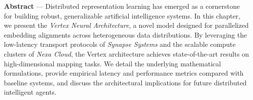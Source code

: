 \begin{tcolorbox}[
    colback=lightbg,
    colframe=secondary,
    arc=0mm,
    outer arc=0mm,
    leftrule=3mm,
    rightrule=0mm,
    toprule=0mm,
    bottomrule=0mm,
    boxsep=4pt,
    left=15pt,
    right=15pt,
    top=10pt,
    bottom=10pt
]
\small
\textbf{Abstract} --- Distributed representation learning has emerged as a cornerstone for building robust, generalizable artificial intelligence systems. In this chapter, we present the \emph{Vertex Neural Architecture}, a novel model designed for parallelized embedding alignments across heterogeneous data distributions. By leveraging the low-latency transport protocols of \emph{Synapse Systems} and the scalable compute clusters of \emph{Nexa Cloud}, the Vertex architecture achieves state-of-the-art results on high-dimensional mapping tasks. We detail the underlying mathematical formulations, provide empirical latency and performance metrics compared with baseline systems, and discuss the architectural implications for future distributed intelligent agents.
\end{tcolorbox}
